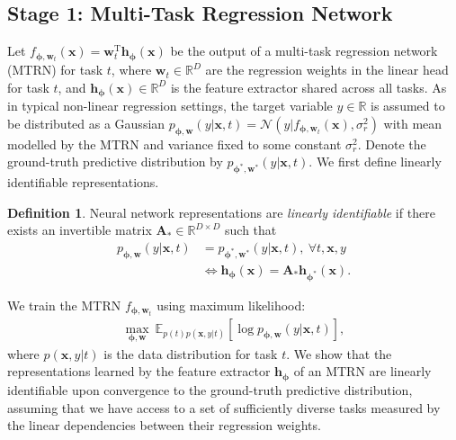 \documentclass[nohyperref]{article}
\theoremstyle{plain}
\theoremstyle{definition}
\newtheorem{definition}[theorem]{Definition}
\theoremstyle{remark}
\begin{document}
\subsection{Stage 1: Multi-Task Regression Network}
Let $f_{\boldsymbol{\phi},\mathbf{w}_t}(\mathbf{x})=\mathbf{w}_t^{\text{T}}\mathbf{h}_{\boldsymbol{\phi}}(\mathbf{x})$ be the output of a multi-task regression network (MTRN) for task $t$, 
where $\mathbf{w}_t\in\mathbb{R}^{D}$ are the regression weights in the linear head for task $t$, and $\mathbf{h}_{\boldsymbol{\phi}}(\mathbf{x})\in\mathbb{R}^{D}$ is the feature extractor shared across all tasks.
As in typical non-linear regression settings, 
the target variable $y\in\mathbb{R}$ is assumed to be distributed as a Gaussian $p_{\boldsymbol{\phi},\mathbf{w}}(y|\mathbf{x},t)=\mathcal{N}(y|f_{\boldsymbol{\phi},\mathbf{w}_t}(\mathbf{x}),\sigma_r^2)$ with mean modelled by the MTRN and variance fixed to some constant $\sigma_r^2$.
Denote the ground-truth predictive distribution by $p_{\boldsymbol{\phi}^*,\mathbf{w}^*}(y|\mathbf{x},t)$.
We first define linearly identifiable representations.
\begin{definition}\label{def:weak-id}
    Neural network representations are \textit{linearly identifiable} if there exists an invertible matrix $\mathbf{A}_{*}\in\mathbb{R}^{D\times D}$ such that
    \begin{equation}
        \begin{split}
            p_{\boldsymbol{\phi},\mathbf{w}}(y|\mathbf{x},t)&=p_{\boldsymbol{\phi}^*,\mathbf{w}^*}(y|\mathbf{x},t),~\forall t,\mathbf{x},y \\
            &\iff \mathbf{h}_{\boldsymbol{\phi}}(\mathbf{x})=\mathbf{A}_{*}\mathbf{h}_{\boldsymbol{\phi}^*}(\mathbf{x}).
        \end{split}
    \end{equation}
\end{definition}
We train the MTRN $f_{\boldsymbol{\phi},\mathbf{w}_t}$ using maximum likelihood:
\begin{align}
    \max_{\boldsymbol{\phi},\mathbf{w}}~\mathbb{E}_{p(t)p(\mathbf{x},y|t)}[\log p_{\boldsymbol{\phi},\mathbf{w}}(y|\mathbf{x},t)],
\end{align}
where $p(\mathbf{x},y|t)$ is the data distribution for task $t$. We show that the representations learned by the feature extractor $\mathbf{h}_{\boldsymbol{\phi}}$ of an MTRN are linearly identifiable upon convergence to the ground-truth predictive distribution, assuming that we have access to a set of sufficiently diverse tasks measured by the linear dependencies between their regression weights. 
\end{document}

